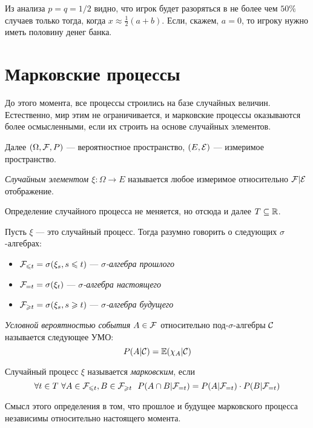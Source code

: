 \begin{note}
	Из анализа $p = q = 1 / 2$ видно, что игрок будет разоряться в не более чем $50\%$ случаев только тогда, когда $x \approx \frac{1}{2}(a + b)$. Если, скажем, $a = 0$, то игроку нужно иметь половину денег банка.
\end{note}

\section{Марковские процессы}

\begin{note}
	До этого момента, все процессы строились на базе случайных величин. Естественно, мир этим не ограничивается, и марковские процессы оказываются более осмысленными, если их строить на основе случайных элементов.
	
	Далее $(\Omega, \mathcal{F}, P)$ --- вероятностное пространство, $(E, \mathcal{E})$ --- измеримое пространство.
\end{note}

\begin{reminder}
	\textit{Случайным элементом $\xi \colon \Omega \to E$} называется любое измеримое относительно $\mathcal{F}|\mathcal{E}$ отображение.
\end{reminder}

\begin{note}
	Определение случайного процесса не меняется, но отсюда и далее $T \subseteq \mathbb{R}$.
\end{note}

\begin{note}
	Пусть $\xi$ --- это случайный процесс. Тогда разумно говорить о следующих $\sigma$-алгебрах:
	\begin{itemize}
		\item $\mathcal{F}_{\leqslant t} = \sigma(\xi_s, s \leqslant t)$ --- \textit{$\sigma$-алгебра прошлого}
		
		\item $\mathcal{F}_{= t} = \sigma(\xi_t)$ --- \textit{$\sigma$-алгебра настоящего}
		
		\item $\mathcal{F}_{\geqslant t} = \sigma(\xi_s, s \geqslant t)$ --- \textit{$\sigma$-алгебра будущего}
	\end{itemize}
\end{note}

\begin{reminder}
	\textit{Условной вероятностью события} $A \in \mathcal{F}$ относительно под-$\sigma$-алгебры $\mathcal{C}$ называется следующее УМО:
	\[
	P(A | \mathcal{C}) = \mathbb{E}(\chi_A | \mathcal{C})
	\]
\end{reminder}

\begin{definition}
	Случайный процесс $\xi$ называется \textit{марковским}, если
	\[
		\forall t \in T\ \forall A \in \mathcal{F}_{\leqslant t}, B \in \mathcal{F}_{\geqslant t}\ \ P(A \cap B | \mathcal{F}_{= t}) = P(A | \mathcal{F}_{= t}) \cdot P(B | \mathcal{F}_{= t})
	\]
\end{definition}

\begin{note}
	Смысл этого определения в том, что прошлое и будущее марковского процесса независимы относительно настоящего момента.
\end{note}
